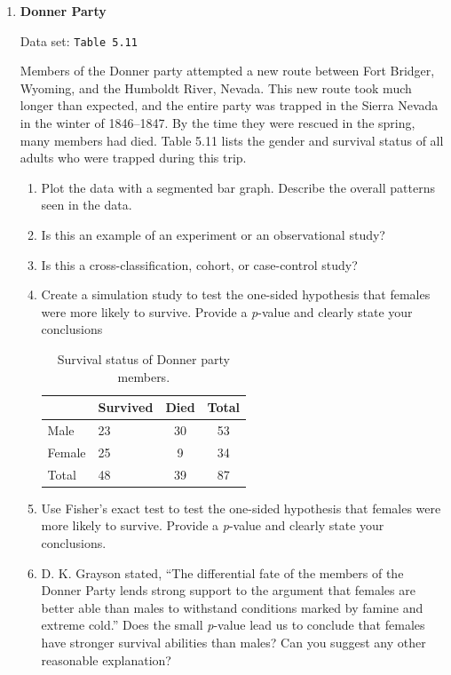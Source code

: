 \documentclass[
]{report}
\begin{document}
\begin{enumerate}
  \item \textbf{Donner Party}    

  Data set: \texttt{Table 5.11}    

  Members of the Donner party attempted a new route between Fort Bridger, Wyoming, and the Humboldt River, Nevada. This new route took much longer than expected, and the entire party was trapped in the Sierra Nevada in the winter of 1846–1847. By the time they were rescued in the spring, many members had died. Table 5.11 lists the gender and survival status of all adults who were trapped during this trip.  
  \begin{enumerate}
    \item Plot the data with a segmented bar graph. Describe the overall patterns seen in the data.
    \item Is this an example of an experiment or an observational study?
    \item Is this a cross-classification, cohort, or case-control study?
    \item Create a simulation study to test the one-sided hypothesis that females were more likely to survive. Provide a \textit{p}-value and clearly state your conclusions
    
\begin{table}[!h]
\centering
\caption{\label{tab:tab11}Survival status of Donner party members.}
\centering
\begin{tabular}[t]{llcc}
\toprule
  & Survived & Died & Total\\
\midrule
Male & 23 & 30 & 53\\
Female & 25 & 9 & 34\\
Total & 48 & 39 & 87\\
\bottomrule
\end{tabular}
\end{table}
    \item Use Fisher’s exact test to test the one-sided hypothesis that females were more likely to survive. Provide a \textit{p}-value and clearly state your conclusions.
    \item D. K. Grayson stated, “The differential fate of the members of the Donner Party lends strong support to the argument that females are better able than males to withstand conditions marked by famine and extreme cold.” Does the small \textit{p}-value lead us to conclude that females have stronger survival abilities than males? Can you suggest any other reasonable explanation?
  \end{enumerate}


\end{enumerate}
\end{document}
